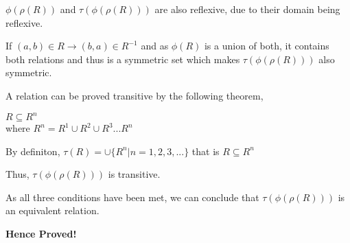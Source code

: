 \documentclass[addpoints]{exam}
\begin{document}
\begin{questions}
\begin{solution}
     $\phi(\rho(R))$ and $\tau(\phi(\rho(R)))$ are also reflexive, due to their domain being reflexive.
     
      If $(a,b) \in R \rightarrow (b,a) \in R^{-1}$ and as $\phi (R)$ is a union of both, it contains both relations and thus is a symmetric set which makes
     $\tau(\phi(\rho(R)))$ also symmetric.
    
    
    A relation can be proved transitive by the following theorem,
    
    $R \subseteq R^n$ \\
    
    where $R^n = R^1 \cup R^2 \cup R^3... R^n$
    
    
    By definiton,
     $\tau (R) = \cup \{ R^n | n = 1,2,3,...\}$ that is $R \subseteq R^n$ 
     
    Thus,  $\tau(\phi(\rho(R)))$ is transitive.
    
    
    As all three conditions have been met, we can conclude that  $\tau(\phi(\rho(R)))$ is an equivalent relation.
     
    \textbf{Hence Proved!}
    
    
  \end{solution}


\end{questions}
\end{document}
